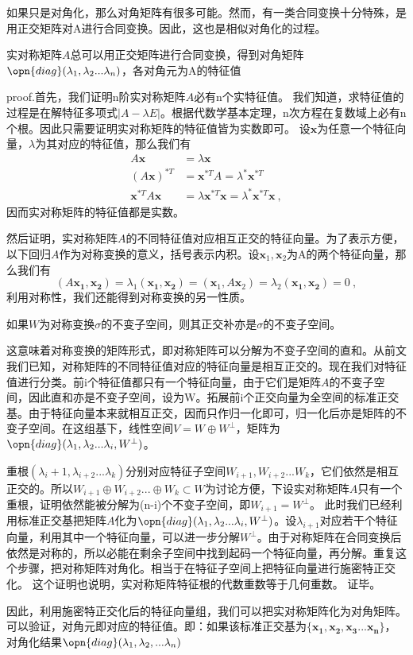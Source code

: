如果只是对角化，那么对角矩阵有很多可能。然而，有一类合同变换十分特殊，是用正交矩阵对A进行合同变换。因此，这也是相似对角化的过程。
\begin{theorem}{}
实对称矩阵$A$总可以用正交矩阵进行合同变换，得到对角矩阵$\opn{diag}(\lambda_1,\lambda_2...\lambda_n)$，各对角元为A的特征值
\end{theorem}  

proof.首先，我们证明n阶实对称矩阵$A$必有n个实特征值。
我们知道，求特征值的过程是在解特征多项式$|A-\lambda E|$。根据代数学基本定理，n次方程在复数域上必有n个根。因此只需要证明实对称矩阵的特征值皆为实数即可。
设$\boldsymbol x$为任意一个特征向量，$\lambda$为其对应的特征值，那么我们有
\begin{equation}
\begin{aligned}
A\boldsymbol x&=\lambda \boldsymbol x\\
(A\boldsymbol x)^{*T}&=\boldsymbol x^{*T}A=\lambda^{*}\boldsymbol x^{*T}\\
\boldsymbol x^{*T}A\boldsymbol x&=\lambda \boldsymbol x^{*T}\boldsymbol x=\lambda^{*}\boldsymbol x^{*T}\boldsymbol x~,
\end{aligned}
\end{equation}
因而实对称矩阵的特征值都是实数。

然后证明，实对称矩阵$A$的不同特征值对应相互正交的特征向量。为了表示方便，以下回归$A$作为对称变换的意义，括号表示内积。设$\boldsymbol x_1,\boldsymbol x_2$为A的两个特征向量，那么我们有
$$(A\boldsymbol {x_1,x_2})=\lambda_1(\boldsymbol {x_1,x_2})=(\boldsymbol x_1,A\boldsymbol x_2)=\lambda_2(\boldsymbol{x_1,x_2})=0~,$$
利用对称性，我们还能得到对称变换的另一性质。
\begin{lemma}{}
如果$W$为对称变换$\sigma$的不变子空间，则其正交补亦是$\sigma$的不变子空间。
\end{lemma}
这意味着对称变换的矩阵形式，即对称矩阵可以分解为不变子空间的直和。从前文我们已知，对称矩阵的不同特征值对应的特征向量是相互正交的。现在我们对特征值进行分类。前i个特征值都只有一个特征向量，由于它们是矩阵$A$的不变子空间，因此直和亦是不变子空间，设为W。拓展前i个正交向量为全空间的标准正交基。由于特征向量本来就相互正交，因而只作归一化即可，归一化后亦是矩阵的不变子空间。在这组基下，线性空间$V=W\oplus W^{\perp}$，矩阵为$\opn{diag}(\lambda_1,\lambda_2...\lambda_i,W^{\perp})$。

重根$(\lambda_i+1,\lambda_{i+2}...\lambda_k)$分别对应特征子空间$W_{i+1},W_{i+2}...W_k$，它们依然是相互正交的。所以$W_{i+1}\oplus W_{i+2}...\oplus W_k\subset W$为讨论方便，下设实对称矩阵$A$只有一个重根，证明依然能被分解为(n-i)个不变子空间，即$W_{i+1}=W^{\perp}$。
此时我们已经利用标准正交基把矩阵$A$化为$\opn{diag}(\lambda_1,\lambda_2...\lambda_i,W^{\perp})$。设$\lambda_{i+1}$对应若干个特征向量，利用其中一个特征向量，可以进一步分解$W^{\perp}$。由于对称矩阵在合同变换后依然是对称的，所以必能在剩余子空间中找到起码一个特征向量，再分解。重复这个步骤，把对称矩阵对角化。相当于在特征子空间上把特征向量进行施密特正交化。
这个证明也说明，实对称矩阵特征根的代数重数等于几何重数。
证毕。

因此，利用施密特正交化后的特征向量组，我们可以把实对称矩阵化为对角矩阵。可以验证，对角元即对应的特征值。即：如果该标准正交基为$\{\boldsymbol{x_1,x_2,x_3...x_n}\}$，对角化结果$\opn{diag}(\lambda_1,\lambda_2,...\lambda_n)$
